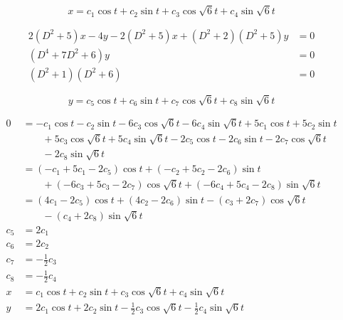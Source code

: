 \documentclass{article}
\begin{document}
\[x = c_1 \cos t + c_2 \sin t + c_3 \cos \sqrt{6} t + c_4 \sin \sqrt{6} t\]

\begin{align*}
  2 (D^2 + 5) x - 4 y - 2 (D^2 + 5) x + (D^2 + 2) (D^2 + 5) y & = 0 \\
  (D^4 + 7 D^2 + 6) y                                         & = 0 \\
  (D^2 + 1) (D^2 + 6)                                         & = 0
\end{align*}

\[y = c_5 \cos t + c_6 \sin t + c_7 \cos \sqrt{6} t + c_8 \sin \sqrt{6} t\]

\begin{align*}
  0   & = -c_1 \cos t - c_2 \sin t - 6 c_3 \cos \sqrt{6} t - 6 c_4 \sin \sqrt{6} t + 5 c_1 \cos t + 5 c_2 \sin t     \\
      & \qquad + 5 c_3 \cos \sqrt{6} t + 5 c_4 \sin \sqrt{6} t - 2 c_5 \cos t - 2 c_6 \sin t - 2 c_7 \cos \sqrt{6} t \\
      & \qquad - 2 c_8 \sin \sqrt{6} t                                                                               \\
      & = (-c_1 + 5 c_1 - 2 c_5) \cos t + (-c_2 + 5 c_2 - 2 c_6) \sin t                                              \\
      & \qquad + (-6 c_3 + 5 c_3 - 2 c_7) \cos \sqrt{6} t + (-6 c_4 + 5 c_4 - 2 c_8) \sin \sqrt{6} t                 \\
      & = (4 c_1 - 2 c_5) \cos t + (4 c_2 - 2 c_6) \sin t - (c_3 + 2 c_7) \cos \sqrt{6} t                            \\
      & \qquad - (c_4 + 2 c_8) \sin \sqrt{6} t                                                                       \\
  c_5 & = 2 c_1                                                                                                      \\
  c_6 & = 2 c_2                                                                                                      \\
  c_7 & = -\frac{1}{2} c_3                                                                                           \\
  c_8 & = -\frac{1}{2} c_4                                                                                           \\
  x   & = c_1 \cos t + c_2 \sin t + c_3 \cos \sqrt{6} t + c_4 \sin \sqrt{6} t                                        \\
  y   & = 2 c_1 \cos t + 2 c_2 \sin t - \frac{1}{2} c_3 \cos \sqrt{6} t - \frac{1}{2} c_4 \sin \sqrt{6} t
\end{align*}
\end{document}
